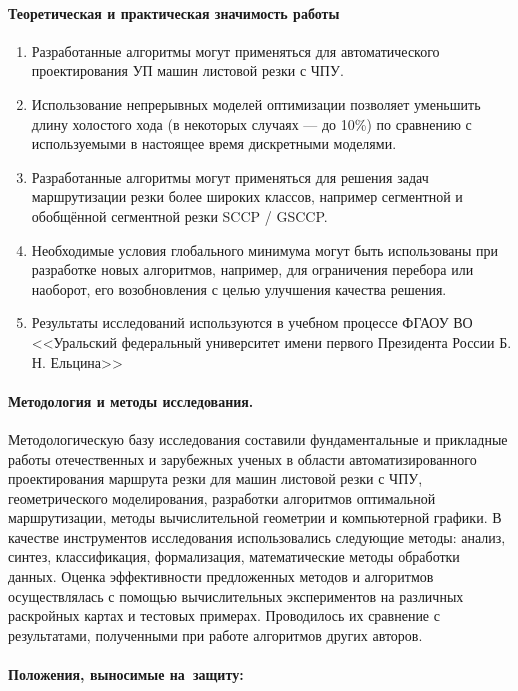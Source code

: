 \paragraph*{Теоретическая и практическая значимость работы}

\begin{enumerate}
    \item
    Разработанные алгоритмы могут применяться для
    автоматического проектирования УП машин листовой резки с ЧПУ.
    \item
    Использование непрерывных моделей оптимизации
    позволяет уменьшить длину
    холостого хода
    (в некоторых случаях --- до 10\%)
    по сравнению с используемыми
    в настоящее время дискретными моделями.
    \item
    Разработанные алгоритмы могут применяться для решения задач
    маршрутизации резки более широких классов,
    например сегментной и обобщённой сегментной резки SCCP / GSCCP.
    \item
    Необходимые условия глобального минимума могут быть использованы при разработке новых
    алгоритмов, например, для ограничения перебора или наоборот,
    его возобновления с целью улучшения качества решения.
    \item
    Результаты исследований используются в учебном процессе
    ФГАОУ ВО <<Уральский федеральный университет имени первого Президента России Б. Н. Ельцина>>
\end{enumerate}

\paragraph*{Методология и методы исследования.}

Методологическую базу исследования составили
фундаментальные и прикладные работы отечественных и зарубежных ученых
в области автоматизированного проектирования маршрута резки для машин листовой резки с ЧПУ,
геометрического моделирования,
разработки алгоритмов оптимальной маршрутизации,
методы вычислительной геометрии и компьютерной графики.
В качестве инструментов исследования использовались следующие методы:
анализ, синтез, классификация, формализация, математические методы обработки данных.
Оценка эффективности предложенных
методов и алгоритмов осуществлялась с помощью вычислительных экспериментов
на различных раскройных картах и тестовых примерах.
Проводилось их сравнение с результатами,
полученными при работе алгоритмов
других авторов.

\paragraph*{Положения, выносимые на~защиту:}

